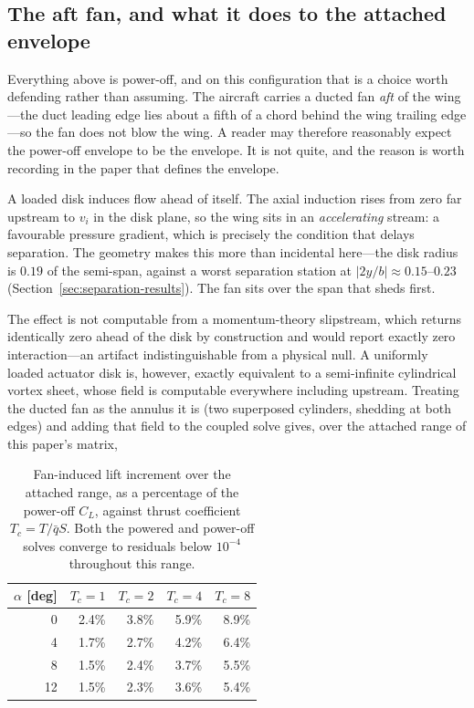 \documentclass[submit]{aiaa-tc}%
\begin{document}
\subsection{The aft fan, and what it does to the attached envelope}
\label{sec:faninduction}

Everything above is power-off, and on this configuration that is a
choice worth defending rather than assuming. The aircraft carries a
ducted fan \emph{aft} of the wing---the duct leading edge lies about a
fifth of a chord behind the wing trailing edge---so the fan does not
blow the wing. A reader may therefore reasonably expect the power-off
envelope to be the envelope. It is not quite, and the reason is worth
recording in the paper that defines the envelope.

A loaded disk induces flow ahead of itself. The axial induction rises
from zero far upstream to $v_i$ in the disk plane, so the wing sits in an
\emph{accelerating} stream: a favourable pressure gradient, which is
precisely the condition that delays separation. The geometry makes this
more than incidental here---the disk radius is $0.19$ of the semi-span,
against a worst separation station at $|2y/b| \approx 0.15$--$0.23$
(Section~\ref{sec:separation-results}). The fan sits over the span that
sheds first.

The effect is not computable from a momentum-theory slipstream, which
returns identically zero ahead of the disk by construction and would
report exactly zero interaction---an artifact indistinguishable from a
physical null. A uniformly loaded actuator disk is, however, exactly
equivalent to a semi-infinite cylindrical vortex sheet, whose field is
computable everywhere including upstream. Treating the ducted fan as the
annulus it is (two superposed cylinders, shedding at both edges) and
adding that field to the coupled solve gives, over the attached range of
this paper's matrix,

\begin{table}[tb]
  \centering
  \caption{Fan-induced lift increment over the attached range, as a
    percentage of the power-off $C_L$, against thrust coefficient
    $T_c = T/\bar q S$. Both the powered and power-off solves converge to
    residuals below $10^{-4}$ throughout this range.}
  \label{tab:faninduction}
  \begin{tabular}{rrrrr}
    \hline
    $\alpha$ [deg] & $T_c = 1$ & $T_c = 2$ & $T_c = 4$ & $T_c = 8$ \\
    \hline
    0  & 2.4\% & 3.8\% & 5.9\% & 8.9\% \\
    4  & 1.7\% & 2.7\% & 4.2\% & 6.4\% \\
    8  & 1.5\% & 2.4\% & 3.7\% & 5.5\% \\
    12 & 1.5\% & 2.3\% & 3.6\% & 5.4\% \\
    \hline
  \end{tabular}
\end{table}
\end{document}
